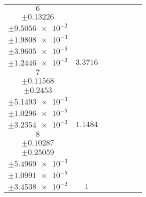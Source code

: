 \documentclass[8pt]{article}
\begin{document}
\begin{longtable}[l]{c c c c c c c}
$\num{6}$ & \begin{tabular}[c]{@{}c@{}}$\num{79.721}$ \\ $\pm\num{0.13226}$\end{tabular} & \begin{tabular}[c]{@{}c@{}}$\num{-0.96147}$ \\ $\pm\num{9.5056e-2}$\end{tabular} & \begin{tabular}[c]{@{}c@{}}$\num{687.31}$ \\ $\pm\num{1.9808e-3}$\end{tabular} & \begin{tabular}[c]{@{}c@{}}$\num{1.3743}$ \\ $\pm\num{3.9605e-6}$\end{tabular} & \begin{tabular}[c]{@{}c@{}}$\num{8.3566}$ \\ $\pm\num{1.2446e-2}$\end{tabular} & $\num{3.3716}$\\
$\num{7}$ & \begin{tabular}[c]{@{}c@{}}$\num{27.021}$ \\ $\pm\num{0.11568}$\end{tabular} & \begin{tabular}[c]{@{}c@{}}$\num{-0.32133}$ \\ $\pm\num{0.2453}$\end{tabular} & \begin{tabular}[c]{@{}c@{}}$\num{696.16}$ \\ $\pm\num{5.1493e-3}$\end{tabular} & \begin{tabular}[c]{@{}c@{}}$\num{1.392}$ \\ $\pm\num{1.0296e-5}$\end{tabular} & \begin{tabular}[c]{@{}c@{}}$\num{8.0118}$ \\ $\pm\num{3.2354e-2}$\end{tabular} & $\num{1.1484}$\\
$\num{8}$ & \begin{tabular}[c]{@{}c@{}}$\num{23.519}$ \\ $\pm\num{0.10287}$\end{tabular} & \begin{tabular}[c]{@{}c@{}}$\num{-0.82978}$ \\ $\pm\num{0.25059}$\end{tabular} & \begin{tabular}[c]{@{}c@{}}$\num{700.29}$ \\ $\pm\num{5.4969e-3}$\end{tabular} & \begin{tabular}[c]{@{}c@{}}$\num{1.4002}$ \\ $\pm\num{1.0991e-5}$\end{tabular} & \begin{tabular}[c]{@{}c@{}}$\num{7.9849}$ \\ $\pm\num{3.4538e-2}$\end{tabular} & $\num{1}$\\
\bottomrule
\end{longtable}
\end{document}
